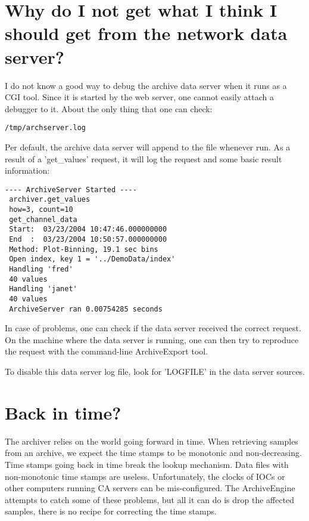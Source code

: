 \section{Why do I not get what I think I should get from the network data server?}
I do not know a good way to debug the archive data server when it runs
as a CGI tool. Since it is started by the web server, one cannot easily
attach a debugger to it.
About the only thing that one can check:
\begin{lstlisting}[keywordstyle=\sffamily]
   /tmp/archserver.log
\end{lstlisting}

\noindent Per default, the archive data server will append to the
 file whenever run. As a result of a
'get\_values' request, it will log the request and some basic result
information:
\begin{lstlisting}[keywordstyle=\sffamily]
 ---- ArchiveServer Started ----
 archiver.get_values
 how=3, count=10
 get_channel_data
 Start:  03/23/2004 10:47:46.000000000
 End  :  03/23/2004 10:50:57.000000000
 Method: Plot-Binning, 19.1 sec bins
 Open index, key 1 = '../DemoData/index'
 Handling 'fred'
 40 values
 Handling 'janet'
 40 values
 ArchiveServer ran 0.00754285 seconds
\end{lstlisting}

\noindent In case of problems, one can check if the data server received the
correct request. On the machine where the data server is running,
one can then try to reproduce the request with the command-line
ArchiveExport tool.

To disable this data server log file, look for 'LOGFILE' in the data
server sources.

\section{Back in time?} \label{sec:back-in-timefaq} 
The archiver relies on the world going forward in time. When
retrieving samples from an archive, we expect the time stamps to be
monotonic and non-decreasing. Time stamps going back in time break the
lookup mechanism. Data files with non-monotonic time stamps are
useless. Unfortunately, the clocks of IOCs or other computers running
CA servers can be mis-configured. The ArchiveEngine attempts to catch
some of these problems, but all it can do is drop the affected
samples, there is no recipe for correcting the time stamps.

